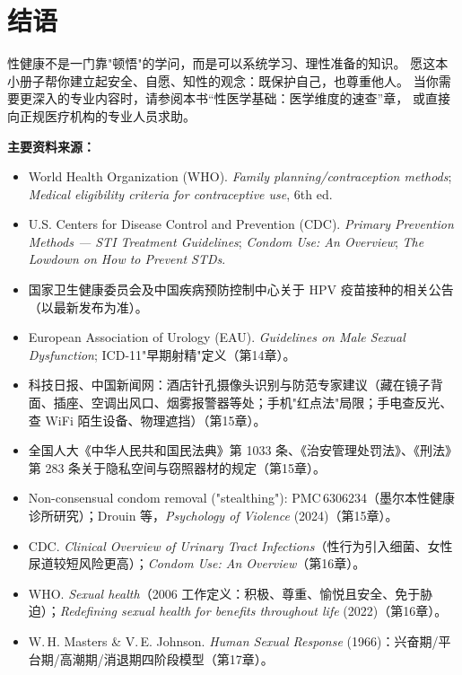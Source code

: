 \documentclass[12pt,UTF8,openany]{ctexbook}
\begin{document}
\chapter*{结语}

性健康不是一门靠"顿悟"的学问，而是可以系统学习、理性准备的知识。
愿这本小册子帮你建立起安全、自愿、知性的观念：既保护自己，也尊重他人。
当你需要更深入的专业内容时，请参阅本书“性医学基础：医学维度的速查”章，
或直接向正规医疗机构的专业人员求助。

\vspace{2em}

\noindent\textbf{主要资料来源：}
\begin{itemize}[leftmargin=2em]
  \item World Health Organization (WHO). \emph{Family planning/contraception methods}; \emph{Medical eligibility criteria for contraceptive use}, 6th ed.
  \item U.S. Centers for Disease Control and Prevention (CDC). \emph{Primary Prevention Methods — STI Treatment Guidelines}; \emph{Condom Use: An Overview}; \emph{The Lowdown on How to Prevent STDs}.
  \item 国家卫生健康委员会及中国疾病预防控制中心关于 HPV 疫苗接种的相关公告（以最新发布为准）。
  \item European Association of Urology (EAU). \emph{Guidelines on Male Sexual Dysfunction}; ICD-11"早期射精"定义（第14章）。
  \item 科技日报、中国新闻网：酒店针孔摄像头识别与防范专家建议（藏在镜子背面、插座、空调出风口、烟雾报警器等处；手机"红点法"局限；手电查反光、查 WiFi 陌生设备、物理遮挡）（第15章）。
  \item 全国人大《中华人民共和国民法典》第 1033 条、《治安管理处罚法》、《刑法》第 283 条关于隐私空间与窃照器材的规定（第15章）。
  \item Non-consensual condom removal ("stealthing"): PMC\,6306234（墨尔本性健康诊所研究）；Drouin 等，\emph{Psychology of Violence} (2024)（第15章）。
  \item CDC. \emph{Clinical Overview of Urinary Tract Infections}（性行为引入细菌、女性尿道较短风险更高）；\emph{Condom Use: An Overview}（第16章）。
  \item WHO. \emph{Sexual health}（2006 工作定义：积极、尊重、愉悦且安全、免于胁迫）；\emph{Redefining sexual health for benefits throughout life} (2022)（第16章）。
  \item W.\,H. Masters \& V.\,E. Johnson. \emph{Human Sexual Response} (1966)：兴奋期/平台期/高潮期/消退期四阶段模型（第17章）。

\end{itemize}
\end{document}
